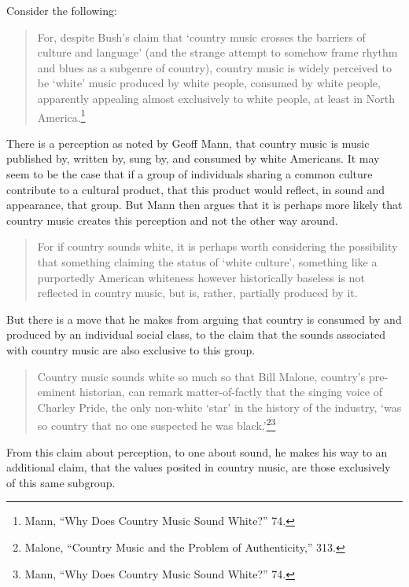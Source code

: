 \documentclass[phdthesis,12pt,final]{wuthesis}
\theoremstyle{definition}
\theoremstyle{definition}
\theoremstyle{definition}
\theoremstyle{definition}
\theoremstyle{remark}
\begin{document}
Consider the following:

\begin{quote}
For, despite Bush's claim that `country music crosses the barriers of culture and language' (and the strange attempt to somehow frame rhythm and blues as a subgenre of country), country music is widely perceived to be `white' music produced by white people, consumed by white people, apparently appealing almost exclusively to white people, at least in North America.\footnote{Mann, {``Why Does Country Music Sound White?''} 74.}
\end{quote}

There is a perception as noted by Geoff Mann, that country music is music published by, written by, sung by, and consumed by white Americans. It may seem to be the case that if a group of individuals sharing a common culture contribute to a cultural product, that this product would reflect, in sound and appearance, that group. But Mann then argues that it is perhaps more likely that country music creates this perception and not the other way around.

\begin{quote}
For if country sounds white, it is perhaps worth considering the possibility that something claiming the status of `white culture', something like a purportedly American whiteness however historically baseless is not reflected in country music, but is, rather, partially produced by it.
\end{quote}

But there is a move that he makes from arguing that country is consumed by and produced by an individual social class, to the claim that the sounds associated with country music are also exclusive to this group.

\begin{quote}
Country music sounds white so much so that Bill Malone, country's pre-eminent historian, can remark matter-of-factly that the singing voice of Charley Pride, the only non-white `star' in the history of the industry, `was so country that no one suspected he was black.'\footnote{Malone, {``Country {Music} and the {Problem} of {Authenticity},''} 313.}\footnote{Mann, {``Why Does Country Music Sound White?''} 74.}
\end{quote}

From this claim about perception, to one about sound, he makes his way to an additional claim, that the values posited in country music, are those exclusively of this same subgroup.
\end{document}
